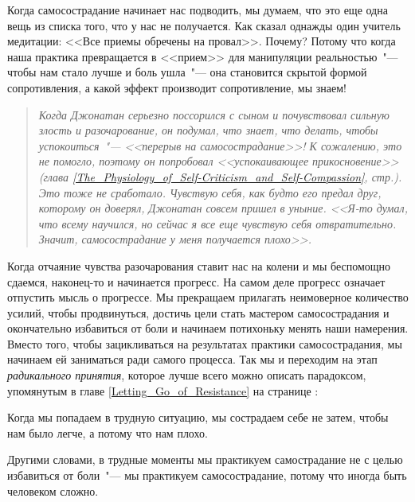 Когда самосострадание начинает нас подводить, мы думаем, что это еще одна вещь из списка того, что у нас не получается. Как сказал однажды один учитель медитации: <<Все приемы обречены на провал>>. Почему? Потому что когда наша практика превращается в <<прием>> для манипуляции реальностью~"--- чтобы нам стало лучше и боль ушла~"--- она становится скрытой формой сопротивления, а какой эффект производит сопротивление, мы знаем! 

\begin{quotation}
	\textit{
		Когда Джонатан серьезно поссорился с сыном и почувствовал сильную злость и разочарование, он подумал, что знает, что делать, чтобы успокоиться~"--- <<перерыв на самосострадание>>! К сожалению, это не помогло, поэтому он попробовал <<успокаивающее прикосновение>> (глава \ref{The_Physiology_of_Self-Criticism_and_Self-Compassion}, стр.\:\pageref{IP:Soothing_Touch}). Это тоже не сработало. Чувствую себя, как будто его предал друг, которому он доверял, Джонатан совсем пришел в уныние. <<Я-то думал, что всему научился, но сейчас я все еще чувствую себя отвратительно. Значит, самосострадание у меня получается плохо>>.  
	}
\end{quotation}

Когда отчаяние чувства разочарования ставит нас на колени и мы беспомощно сдаемся, наконец-то и начинается прогресс. На самом деле прогресс означает отпустить мысль о прогрессе. Мы прекращаем прилагать неимоверное количество усилий, чтобы продвинуться, достичь цели стать мастером самосострадания и окончательно избавиться от боли и начинаем потихоньку менять наши намерения. Вместо того, чтобы зацикливаться на результатах практики самосострадания, мы начинаем ей заниматься ради самого процесса. Так мы и переходим на этап \emph{радикального принятия}, которое лучше всего можно описать парадоксом, упомянутым в главе \ref{Letting_Go_of_Resistance} на странице \pageref{Letting_Go_of_Resistance}: 

\vspace{3ex}

\begin{center}
	{\Large Когда мы попадаем в трудную ситуацию, мы сострадаем себе не затем, чтобы нам было легче, а потому что нам плохо.}
\end{center}

\vspace{4ex}

Другими словами, в трудные моменты мы практикуем самострадание не с целью избавиться от боли~"--- мы практикуем самосострадание, потому что иногда быть человеком сложно.

